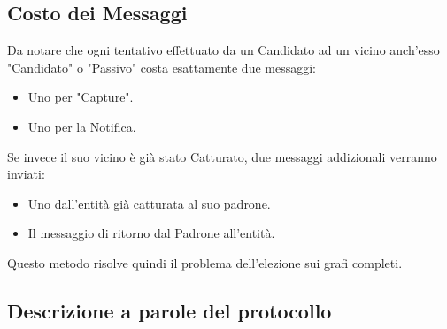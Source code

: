 \subsection{Costo dei Messaggi}
Da notare che ogni tentativo effettuato da un Candidato ad un vicino anch'esso
"Candidato" o "Passivo" costa esattamente due messaggi:
\begin{itemize}
    \item Uno per "Capture".
    \item Uno per la Notifica.
\end{itemize}
Se invece il suo vicino è già stato Catturato, due messaggi addizionali verranno
inviati:
\begin{itemize}
    \item Uno dall'entità già catturata al suo padrone.
    \item Il messaggio di ritorno dal Padrone all'entità.
\end{itemize}
Questo metodo risolve quindi il problema dell'elezione sui grafi completi.

\subsection{Descrizione a parole del protocollo}

